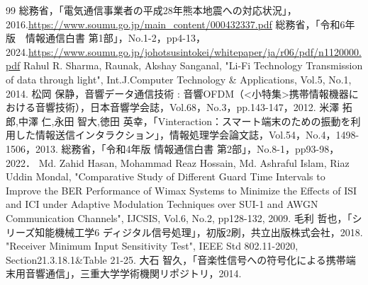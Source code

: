 \begin{thebibliography}{99}
総務省，「電気通信事業者の平成28年熊本地震への対応状況」，2016.\url{https://www.soumu.go.jp/main_content/000432337.pdf}
総務省，「令和6年版　情報通信白書 第1部」，No.1-2，pp4-13，2024.\url{https://www.soumu.go.jp/johotsusintokei/whitepaper/ja/r06/pdf/n1120000.pdf}
Rahul R. Sharma, Raunak, Akshay Sanganal, "Li-Fi Technology Transmission of data through light", Int.J.Computer Technology \& Applications, Vol.5, No.1, 2014.
松岡 保静，音響データ通信技術 : 音響OFDM（<小特集>携帯情報機器における音響技術），日本音響学会誌，Vol.68，No.3，pp.143-147，2012.
米澤 拓郎,中澤 仁,永田 智大,徳田 英幸，「Vinteraction：スマート端末のための振動を利用した情報送信インタラクション」，情報処理学会論文誌，Vol.54，No.4，1498-1506，2013.
総務省，「令和4年版 情報通信白書 第2部」，No.8-1，pp93-98，2022．
Md. Zahid Hasan, Mohammad Reaz Hossain, Md. Ashraful Islam, Riaz Uddin Mondal, "Comparative Study of Different Guard Time Intervals to Improve the BER Performance of Wimax Systems to Minimize the Effects of ISI and ICI under Adaptive Modulation Techniques over SUI-1 and AWGN Communication Channels", IJCSIS, Vol.6,  No.2, pp128-132, 2009.
毛利 哲也，「シリーズ知能機械工学6 ディジタル信号処理」，初版2刷，共立出版株式会社，2018.
"Receiver Minimum Input Sensitivity Test", IEEE Std 802.11-2020, Section21.3.18.1\&Table 21-25.
大石 智久，「音楽性信号への符号化による携帯端末用音響通信」，三重大学学術機関リポジトリ，2014.
\end{thebibliography}
\clearpage
